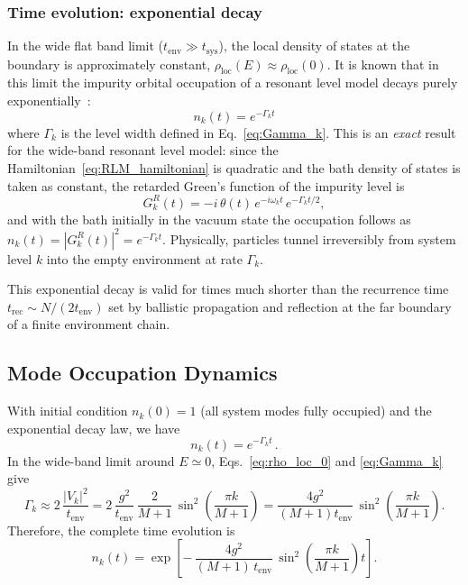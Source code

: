 \documentclass[12pt,oneside,openright]{report}
\theoremstyle{definition}
\theoremstyle{plain}
\theoremstyle{remark}
\begin{document}
\subsubsection{Time evolution: exponential decay}
\label{subsec:time_evolution_derivation}

In the wide flat band limit ($t_{\mathrm{env}} \gg t_{\mathrm{sys}}$), the local density of states at the boundary is approximately constant, $\rho_{\mathrm{loc}}(E) \approx \rho_{\mathrm{loc}}(0)$. It is known that in this limit the impurity orbital occupation of a resonant level model decays purely exponentially~\cite{PhysRevB.32.4410,Langreth1991}:
\begin{equation}
n_k(t) = e^{-\Gamma_k t}
\end{equation}
where $\Gamma_k$ is the level width defined in Eq.~\eqref{eq:Gamma_k}.
This is an \emph{exact} result for the wide-band resonant level model: since the Hamiltonian~\eqref{eq:RLM_hamiltonian} is quadratic and the bath density of states is taken as constant, the retarded Green's function of the impurity level is
\begin{equation}
G_k^R(t) = -i\,\theta(t)\,e^{-i\omega_k t}\,e^{-\Gamma_k t/2},
\end{equation}
and with the bath initially in the vacuum state the occupation follows as $n_k(t) = |G_k^R(t)|^2 = e^{-\Gamma_k t}$.
Physically, particles tunnel irreversibly from system level $k$ into the empty environment at rate $\Gamma_k$.

This exponential decay is valid for times much shorter than the recurrence time $t_{\mathrm{rec}} \sim N/(2t_{\mathrm{env}})$ set by ballistic propagation and reflection at the far boundary of a finite environment chain.

\subsection{Mode Occupation Dynamics}

With initial condition $n_k(0) = 1$ (all system modes fully occupied) and the exponential decay law, we have
\begin{equation}
n_k(t) = e^{-\Gamma_k t}\,.
\end{equation}
In the wide-band limit around $E\simeq 0$, Eqs.~\eqref{eq:rho_loc_0} and \eqref{eq:Gamma_k} give
\begin{equation}
\Gamma_k \approx 2\,\frac{|V_k|^2}{t_{\mathrm{env}}} = 2\,\frac{g^2}{t_{\mathrm{env}}}\,\frac{2}{M+1}\, \sin^2\!\left(\frac{\pi k}{M+1}\right) = \frac{4 g^2}{(M+1) t_{\mathrm{env}}}\, \sin^2\!\left(\frac{\pi k}{M+1}\right).
\end{equation}
Therefore, the complete time evolution is
\begin{equation}
n_k(t) = \exp\!\left[-\,\frac{4 g^2}{(M+1)\, t_{\mathrm{env}}}\, \sin^2\!\left(\frac{\pi k}{M+1}\right) t\right].
\label{eq:nk_explicit}
\end{equation}
\end{document}
